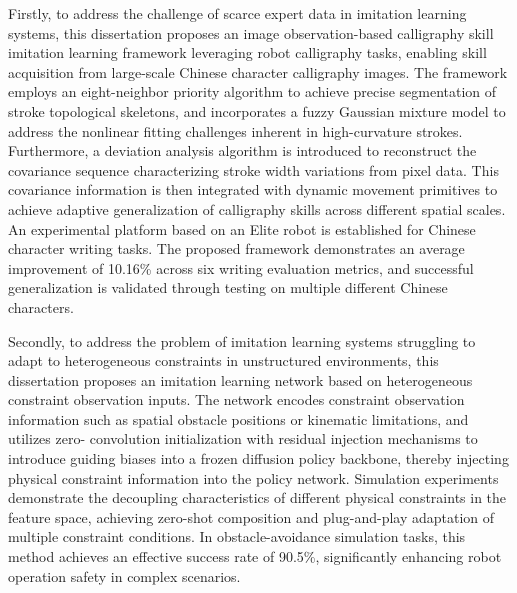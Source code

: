 Firstly, to address the challenge of scarce expert data in imitation learning systems, this dissertation proposes an image observation-based calligraphy skill imitation learning framework leveraging robot calligraphy tasks, enabling skill acquisition from large-scale Chinese character calligraphy images. The framework employs an eight-neighbor priority algorithm to achieve precise segmentation of stroke topological skeletons, and incorporates a fuzzy Gaussian mixture model to address the nonlinear fitting challenges inherent in high-curvature strokes. Furthermore, a deviation analysis algorithm is introduced to reconstruct the covariance sequence characterizing stroke width variations from pixel data. This covariance information is then integrated with dynamic movement primitives to achieve adaptive generalization of calligraphy skills across different spatial scales. An experimental platform based on an Elite robot is established for Chinese character writing tasks. The proposed framework demonstrates an average improvement of 10.16\% across six writing evaluation metrics, and successful generalization is validated through testing on multiple different Chinese characters.

Secondly, to address the problem of imitation learning systems struggling to adapt to heterogeneous constraints in unstructured environments, this dissertation proposes an imitation learning network based on heterogeneous constraint observation inputs. The network encodes constraint observation information such as spatial obstacle positions or kinematic limitations, and utilizes zero- convolution initialization with residual injection mechanisms to introduce guiding biases into a frozen diffusion policy backbone, thereby injecting physical constraint information into the policy network. Simulation experiments demonstrate the decoupling characteristics of different physical constraints in the feature space, achieving zero-shot composition and plug-and-play adaptation of multiple constraint conditions. In obstacle-avoidance simulation tasks, this method achieves an effective success rate of 90.5\%, significantly enhancing robot operation safety in complex scenarios.

